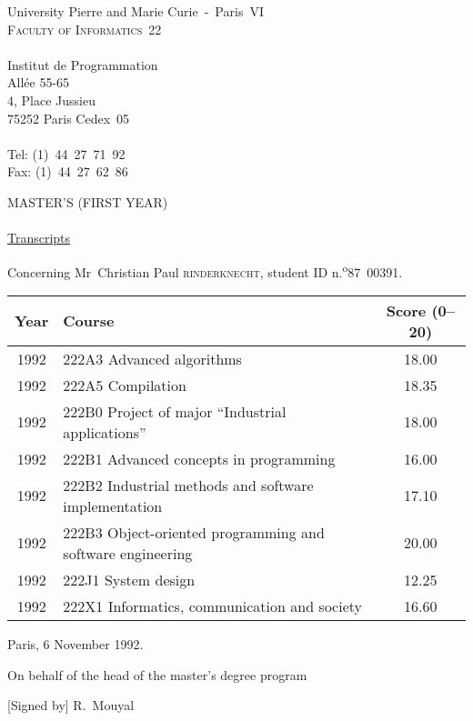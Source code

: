 \documentclass[a4paper,11pt,twoside]{article}
\begin{document}
\thispagestyle{empty}

\begin{flushleft}
University Pierre and Marie Curie~-~Paris~VI\\
\textsc{Faculty of Informatics~22}\\
\ \\
Institut de Programmation\\
All\'ee 55-65\\
4, Place Jussieu\\
75252 Paris Cedex~05\\
\ \\
Tel: (1)~44~27~71~92\\
Fax: (1)~44~27~62~86
\end{flushleft}

\bigskip\bigskip\bigskip

\begin{center}
\textsc{\Large MASTER'S (FIRST YEAR)}\\
\ \\
\underline{\Large Transcripts}
\end{center}

\bigskip\bigskip\bigskip

Concerning Mr~Christian Paul \textsc{rinderknecht}, student ID
n.\kern-0.5bp\textsuperscript{o}87~00391.

\bigskip

\begin{center}
\begin{tabular}{@{}|c|l|c|@{}}
\hline
Year & Course & Score (0--20)\\
\hline
1992 & 222A3 Advanced algorithms & 18.00\\
\hline
1992 & 222A5 Compilation & 18.35\\
\hline
1992 & 222B0 Project of major ``Industrial applications'' & 18.00\\
\hline
1992 & 222B1 Advanced concepts in programming & 16.00\\
\hline
1992 & 222B2 Industrial methods and software implementation & 17.10\\
\hline
1992 & 222B3 Object-oriented programming and software engineering &
20.00\\
\hline
1992 & 222J1 System design & 12.25\\
\hline
1992 & 222X1 Informatics, communication and society & 16.60\\
\hline
\end{tabular}
\end{center}

\bigskip

Paris, 6 November 1992.

\bigskip

On behalf of the head of the master's degree program\\

\medskip

[Signed by] R.~Mouyal
\end{document}
